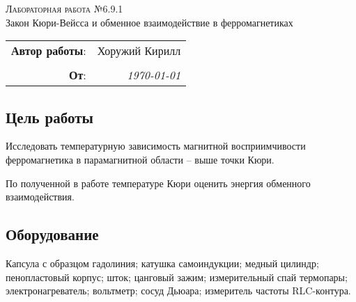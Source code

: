 
\phantom{42}
\vspace{20mm}

\begin{center}
    \LARGE \textsc{Лабораторная работа №6.9.1} \\
    \vspace{3 mm}
    \large Закон Кюри-Вейсса и обменное взаимодействие в ферромагнетиках
\end{center}


\phantom{42}

\begin{flushright}
    \begin{tabular}{rr}
        \textbf{Автор работы}: 
        & Хоружий Кирилл \\
        & \\
        \textbf{От}: &
        \textit{\today}\\
    \end{tabular}
\end{flushright}

\thispagestyle{empty}

\vspace{10mm}


\subsection*{Цель работы}
\begin{enumerate*}
    \item Исследовать температурную зависимость магнитной восприимчивости ферромагнетика в парамагнитной области -- выше точки Кюри.
    \item По полученной в работе температуре Кюри оценить энергия обменного взаимодействия.

\end{enumerate*}


\subsection*{Оборудование}
Капсула с образцом гадолиния; катушка самоиндукции; медный цилиндр; пенопластовый корпус; шток; цанговый зажим; измерительный спай термопары; электронагреватель; вольтметр; сосуд Дьюара; измеритель частоты RLC-контура.





\newpage
